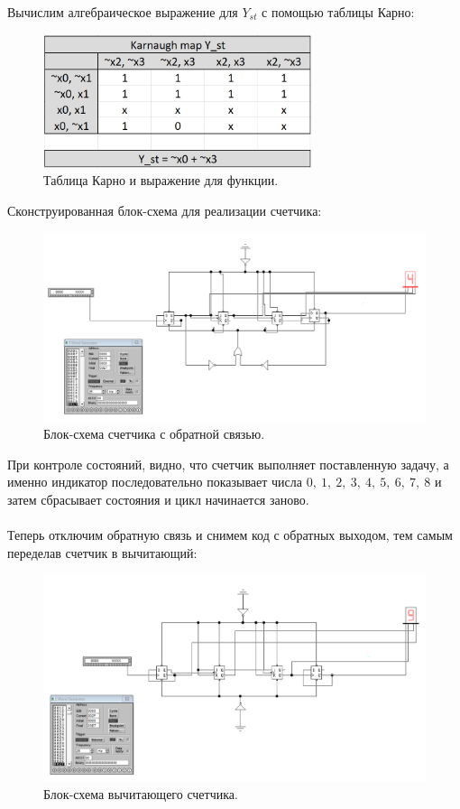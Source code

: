 \documentclass[12pt]{article}
\begin{document}
Вычислим алгебраическое выражение для $Y_{st}$ с помощью таблицы Карно:
\begin{figure}[H]
    \centering
    \includegraphics[width=0.7\textwidth]{kar.png}
    \caption{Таблица Карно и выражение для функции.}
    \label{fig:kar}
\end{figure}

Сконструированная блок-схема для реализации счетчика:
\begin{figure}[H]
    \centering
    \includegraphics[width=\textwidth]{scheme.png}
    \caption{Блок-схема счетчика с обратной связью.}
    \label{fig:scheme}
\end{figure}

При контроле состояний, видно, что счетчик выполняет поставленную задачу, а именно индикатор последовательно показывает числа $0, \ 1, \ 2, \ 3, \ 4, \ 5, \ 6, \ 7, \ 8$ и затем сбрасывает состояния и цикл начинается заново. \\
\ \\
Теперь отключим обратную связь и снимем код с обратных выходом, тем самым переделав счетчик в вычитающий:
\begin{figure}[H]
    \centering
    \includegraphics[width=\textwidth]{scheme_sub.png}
    \caption{Блок-схема вычитающего счетчика.}
    \label{fig:scheme_sub}
\end{figure}
\end{document}
